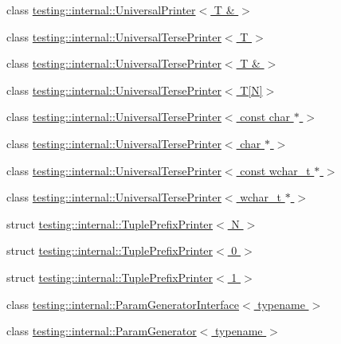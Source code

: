 \begin{DoxyCompactItemize}
\item 
class \hyperlink{classtesting_1_1internal_1_1_universal_printer_3_01_t_01_6_01_4}{testing\-::internal\-::\-Universal\-Printer$<$ T \& $>$}
\item 
class \hyperlink{classtesting_1_1internal_1_1_universal_terse_printer}{testing\-::internal\-::\-Universal\-Terse\-Printer$<$ T $>$}
\item 
class \hyperlink{classtesting_1_1internal_1_1_universal_terse_printer_3_01_t_01_6_01_4}{testing\-::internal\-::\-Universal\-Terse\-Printer$<$ T \& $>$}
\item 
class \hyperlink{classtesting_1_1internal_1_1_universal_terse_printer_3_01_t[_n]_4}{testing\-::internal\-::\-Universal\-Terse\-Printer$<$ T\mbox{[}\-N\mbox{]}$>$}
\item 
class \hyperlink{classtesting_1_1internal_1_1_universal_terse_printer_3_01const_01char_01_5_01_4}{testing\-::internal\-::\-Universal\-Terse\-Printer$<$ const char $\ast$ $>$}
\item 
class \hyperlink{classtesting_1_1internal_1_1_universal_terse_printer_3_01char_01_5_01_4}{testing\-::internal\-::\-Universal\-Terse\-Printer$<$ char $\ast$ $>$}
\item 
class \hyperlink{classtesting_1_1internal_1_1_universal_terse_printer_3_01const_01wchar__t_01_5_01_4}{testing\-::internal\-::\-Universal\-Terse\-Printer$<$ const wchar\-\_\-t $\ast$ $>$}
\item 
class \hyperlink{classtesting_1_1internal_1_1_universal_terse_printer_3_01wchar__t_01_5_01_4}{testing\-::internal\-::\-Universal\-Terse\-Printer$<$ wchar\-\_\-t $\ast$ $>$}
\item 
struct \hyperlink{structtesting_1_1internal_1_1_tuple_prefix_printer}{testing\-::internal\-::\-Tuple\-Prefix\-Printer$<$ N $>$}
\item 
struct \hyperlink{structtesting_1_1internal_1_1_tuple_prefix_printer_3_010_01_4}{testing\-::internal\-::\-Tuple\-Prefix\-Printer$<$ 0 $>$}
\item 
struct \hyperlink{structtesting_1_1internal_1_1_tuple_prefix_printer_3_011_01_4}{testing\-::internal\-::\-Tuple\-Prefix\-Printer$<$ 1 $>$}
\item 
class \hyperlink{classtesting_1_1internal_1_1_param_generator_interface}{testing\-::internal\-::\-Param\-Generator\-Interface$<$ typename $>$}
\item 
class \hyperlink{classtesting_1_1internal_1_1_param_generator}{testing\-::internal\-::\-Param\-Generator$<$ typename $>$}
\item 

\end{DoxyCompactItemize}
